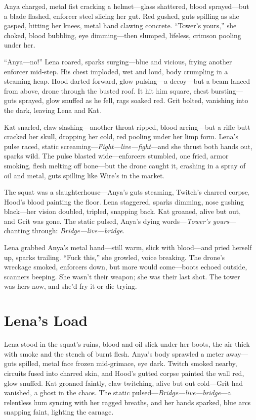 \documentclass[12pt]{book}
\begin{document}
Anya charged, metal fist cracking a helmet---glass shattered, blood sprayed---but a blade flashed, enforcer steel slicing her gut. Red gushed, guts spilling as she gasped, hitting her knees, metal hand clawing concrete. ``Tower’s yours,'' she choked, blood bubbling, eye dimming---then slumped, lifeless, crimson pooling under her.

``Anya---no!'' Lena roared, sparks surging---blue and vicious, frying another enforcer mid-step. His chest imploded, wet and loud, body crumpling in a steaming heap. Hood darted forward, glow pulsing---a decoy---but a beam lanced from above, drone through the busted roof. It hit him square, chest bursting---guts sprayed, glow snuffed as he fell, rags soaked red. Grit bolted, vanishing into the dark, leaving Lena and Kat.

Kat snarled, claw slashing---another throat ripped, blood arcing---but a rifle butt cracked her skull, dropping her cold, red pooling under her limp form. Lena’s pulse raced, static screaming---\emph{Fight---live---fight}---and she thrust both hands out, sparks wild. The pulse blasted wide---enforcers stumbled, one fried, armor smoking, flesh melting off bone---but the drone caught it, crashing in a spray of oil and metal, guts spilling like Wire’s in the market.

The squat was a slaughterhouse---Anya’s guts steaming, Twitch’s charred corpse, Hood’s blood painting the floor. Lena staggered, sparks dimming, nose gushing black---her vision doubled, tripled, snapping back. Kat groaned, alive but out, and Grit was gone. The static pulsed, Anya’s dying words---\emph{Tower’s yours}---chanting through: \emph{Bridge---live---bridge}.

Lena grabbed Anya’s metal hand---still warm, slick with blood---and pried herself up, sparks trailing. ``Fuck this,'' she growled, voice breaking. The drone’s wreckage smoked, enforcers down, but more would come---boots echoed outside, scanners beeping. She wasn’t their weapon; she was their last shot. The tower was hers now, and she’d fry it or die trying.

\section{Lena's Load}

Lena stood in the squat’s ruins, blood and oil slick under her boots, the air thick with smoke and the stench of burnt flesh. Anya’s body sprawled a meter away---guts spilled, metal face frozen mid-grimace, eye dark. Twitch smoked nearby, circuits fused into charred skin, and Hood’s gutted corpse painted the wall red, glow snuffed. Kat groaned faintly, claw twitching, alive but out cold---Grit had vanished, a ghost in the chaos. The static pulsed---\emph{Bridge---live---bridge}---a relentless hum syncing with her ragged breaths, and her hands sparked, blue arcs snapping faint, lighting the carnage.
\end{document}
